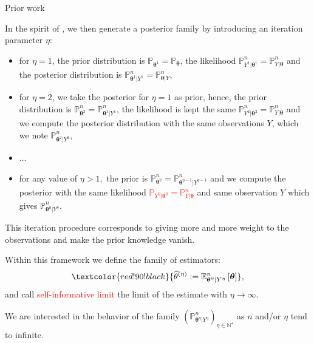 \documentclass[final,hyperref={pdfpagelabels=false}]{beamer}
\begin{document}
\begin{frame}[t]
\begin{columns}[t]
\begin{column}{.30\textwidth}
\begin{block}{\rule{0pt}{2.5ex} Prior work}
\bigskip

In the spirit of \citet{OBJJ}, we then generate a posterior family by introducing an \textcolor{red!90!black}{iteration parameter $\eta$}:
\begin{itemize}
\item for $\eta = 1$, the prior distribution is $\mathbb{P}_{\boldsymbol{\theta}^{1}} = \mathbb{P}_{\boldsymbol{\theta}}$, the likelihood $\mathbb{P}_{Y^{1} \vert \boldsymbol{\theta}^{1}}^{n} = \mathbb{P}_{Y \vert \boldsymbol{\theta}}^{n}$ and the posterior distribution is $\mathbb{P}_{\boldsymbol{\theta}^{1}\vert Y^{1}}^{n} =\mathbb{P}_{\boldsymbol{\theta}\vert Y}^{n}$,
\item for $\eta = 2$, we take the posterior for $\eta = 1$ as prior, hence, the prior distribution is $ \mathbb{P}_{\boldsymbol{\theta}^{2}}^{n} = \mathbb{P}_{\boldsymbol{\theta}^{1}\vert Y^{1}}^{n}$, the likelihood is kept the same $\mathbb{P}_{Y^{2} \vert \boldsymbol{\theta}^{2}}^{n} = \mathbb{P}_{Y \vert \boldsymbol{\theta}}^{n}$ and we compute the posterior distribution with the same observations $Y$, which we note $\mathbb{P}_{\boldsymbol{\theta}^{2}\vert Y^{2}}^{n}$,
\item $\hdots$
\item for any value of $\eta > 1,$ the prior is \textcolor{red!90!black}{$ \mathbb{P}_{\boldsymbol{\theta}^{\eta}}^{n} = \mathbb{P}_{\boldsymbol{\theta}^{\eta - 1} \vert Y^{\eta - 1}}^{n}$} and we compute the posterior with the same likelihood \textcolor{red}{$\mathbb{P}_{Y^{\eta} \vert \boldsymbol{\theta}^{\eta}} = \mathbb{P}_{Y \vert \boldsymbol{\theta}}^{n}$} and same observation $Y$ which gives \textcolor{red!90!black}{$\mathbb{P}_{\boldsymbol{\theta}^{\eta} \vert Y^{\eta}}^{n}$}.
\end{itemize}

This iteration procedure corresponds to giving more and more weight to the observations and make the prior knowledge vanish.

\medskip

Within this framework we define the family of estimators:
\[\textcolor{red!90!black}{\widehat{\theta}^{\left(\eta\right)} := \mathbb{E}_{\boldsymbol{\theta}^{\eta}\vert Y^{\eta}}^{n}\left[\boldsymbol{\theta}\right]},\]
and call \textcolor{red}{self-informative limit} the limit of the estimate with $\eta \rightarrow \infty.$

\medskip

We are interested in the behavior of the family $\left(\mathbb{P}_{\boldsymbol{\theta}^{\eta}\vert Y^{\eta}}^{n}\right)_{\eta \in \mathbb{N}^{\star}}$ as $n$ and/or $\eta$ tend to infinite.


\end{block}
\end{column}
\end{columns}
\end{frame}
\end{document}
